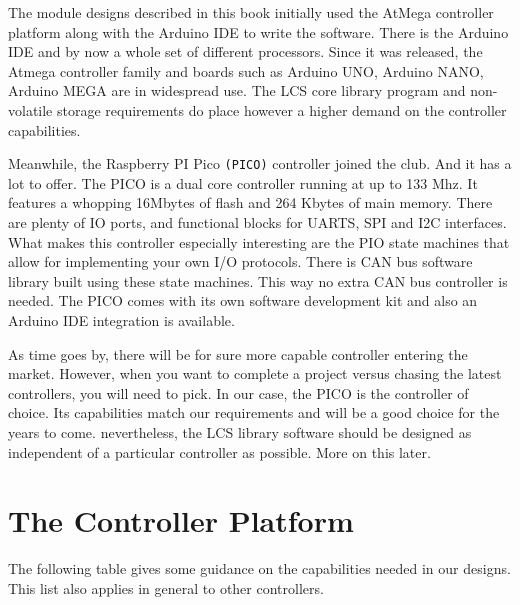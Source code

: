 The module designs described in this book initially used the AtMega controller platform along with the Arduino IDE to write the software. There is the Arduino IDE and by now a whole set of different processors. Since it was released, the Atmega controller family and boards such as Arduino UNO, Arduino NANO, Arduino MEGA are in widespread use. The LCS core library program and non-volatile storage requirements do place however a higher demand on the controller capabilities.

Meanwhile, the Raspberry PI Pico \texttt{(PICO)} controller joined the club. And it has a lot to offer. The PICO is a dual core controller running at up to 133 Mhz. It features a whopping 16Mbytes of flash and 264 Kbytes of main memory. There are plenty of IO ports, and functional blocks for UARTS, SPI and I2C interfaces. What makes this controller especially interesting are the PIO state machines that allow for implementing your own I/O protocols. There is CAN bus software library built using these state machines. This way no extra CAN bus controller is needed. The PICO comes with its own software development kit and also an Arduino IDE integration is available.

As time goes by, there will be for sure more capable controller entering the market. However, when you want to complete a project versus chasing the latest controllers, you will need to pick. In our case, the PICO is the controller of choice. Its capabilities match our requirements and will be a good choice for the years to come. nevertheless, the LCS library software should be designed as independent of a particular controller as possible. More on this later. 

\section{The Controller Platform}

 The following table gives some guidance on the capabilities needed in our designs. This list also applies in general to other controllers.


